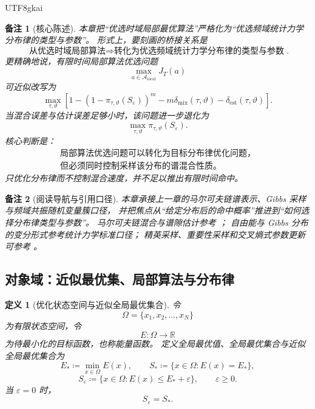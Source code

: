 \documentclass[12pt]{article}
\newtheorem{definition}{定义}[section]
\newtheorem{remark}{备注}[section]
\newcommand{\RR}{\mathbb{R}}
\newcommand{\DefEq}{\coloneqq}
\begin{document}
\begin{CJK*}{UTF8}{gkai}
\begin{remark}[核心陈述]
本章把“优选时域局部最优算法”严格化为“优选频域统计力学分布律的类型与参数”。
形式上，要刻画的桥接关系是
\[
  \boxed{
  \text{从优选时域局部算法}
  \Longrightarrow
  \text{转化为优选频域统计力学分布律的类型与参数}
  }.
\]
更精确地说，有限时间局部算法优选问题
\[
  \max_{a\in\mathcal A_{\mathrm{local}}}J_T(a)
\]
可近似改写为
\[
  \max_{\tau,\vartheta}
  \left[
    1-\left(1-\pi_{\tau,\vartheta}(S_\varepsilon)\right)^m
    -m\delta_{\mathrm{mix}}(\tau,\vartheta)
    -\delta_{\mathrm{est}}(\tau,\vartheta)
  \right].
\]
当混合误差与估计误差足够小时，该问题进一步退化为
\[
  \boxed{
  \max_{\tau,\vartheta}\pi_{\tau,\vartheta}(S_\varepsilon)
  }.
\]
核心判断是：
\[
  \boxed{
  \begin{gathered}
  \text{局部算法优选问题可以转化为目标分布律优化问题，}\\
  \text{但必须同时控制采样该分布的谱混合性质。}
  \end{gathered}
  }
\]
只优化分布律而不控制混合速度，并不足以推出有限时间命中。
\end{remark}

\begin{remark}[阅读导航与引用口径]
本章承接上一章的马尔可夫链谱表示、Gibbs 采样与频域共振随机变量簇口径，
并把焦点从“给定分布后的命中概率”推进到“如何选择分布律类型与参数”。
马尔可夫链混合与谱隙估计参考 \cite{LevinPeresWilmer2017Markov,Norris1998MarkovChains}；
自由能与 Gibbs 分布的变分形式参考统计力学标准口径；
精英采样、重要性采样和交叉熵式参数更新可参考 \cite{Rubinstein1999CrossEntropy}。
\end{remark}

\subsection{对象域：近似最优集、局部算法与分布律}
\label{subsec:tex55-law-selection-objects}

\begin{definition}[优化状态空间与近似全局最优集合]
\label{def:tex55-law-state-space}
令
\[
  \Omega=\{x_1,x_2,\ldots,x_N\}
\]
为有限状态空间，令
\[
  E:\Omega\to\RR
\]
为待最小化的目标函数，也称能量函数。
定义全局最优值、全局最优集合与近似全局最优集合为
\[
  E_*\DefEq\min_{x\in\Omega}E(x),
  \qquad
  S_*\DefEq\{x\in\Omega:E(x)=E_*\},
\]
\[
  S_\varepsilon
  \DefEq
  \{x\in\Omega:E(x)\le E_*+\varepsilon\},
  \qquad
  \varepsilon\ge0.
\]
当 \(\varepsilon=0\) 时，
\[
  S_\varepsilon=S_*.
\]
\end{definition}


\end{CJK*}
\end{document}
